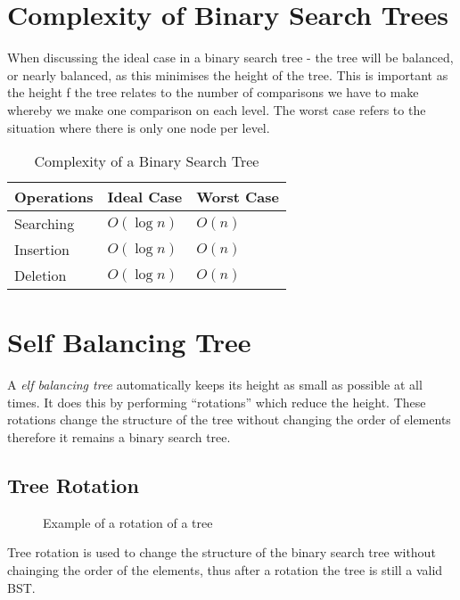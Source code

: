 
\section{Complexity of Binary Search Trees}
When discussing the ideal case in a binary search tree - the tree will be balanced, or nearly balanced, as this minimises the height of the tree. This is important as the height f the tree relates to the number of comparisons we have to make whereby we make one comparison on each level. The worst case refers to the situation where there is only one node per level.

\begin{table}[H]
    \centering
    {\RaggedRight
    \begin{tabular}{p{} p{} p{}}
    \textbf{Operations} & \textbf{Ideal Case} & \textbf{Worst Case}\\
    \hline
    \hline
    Searching & $O(\log n)$ & $O(n)$ \\
    \hline
    Insertion & $O(\log n)$ & $O(n)$ \\
    \hline
    Deletion & $O(\log n)$ & $O(n)$ \\
    \hline
    \end{tabular}
    } %
    \caption{Complexity of a Binary Search Tree}
\end{table}

\section{Self Balancing Tree}
A \textit{elf balancing tree} automatically keeps its height as small as possible at all times. It does this by performing ``rotations'' which reduce the height. These rotations change the structure of the tree without changing the order of elements therefore it remains a binary search tree.
\subsection{Tree Rotation}
\begin{figure}[H]
    \centering
    
    \caption{Example of a rotation of a tree}
\end{figure}

Tree rotation is used to change the structure of the binary search tree without chainging the order of the elements, thus after a rotation the tree is still a valid BST. \\

